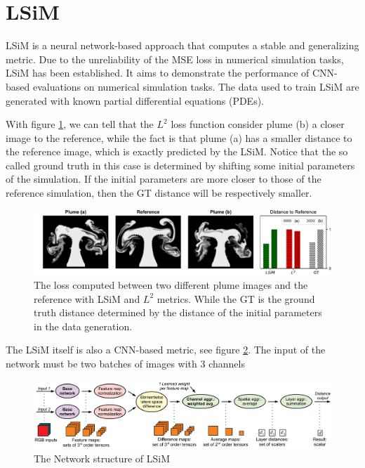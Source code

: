 \documentclass[a4paper,12pt,twoside]{report}
\begin{document}
\section{LSiM}

LSiM \cite{kohl2020learning} is a neural network-based approach that computes a stable and generalizing metric. Due to the unreliability of the MSE loss in numerical simulation tasks, LSiM has been established. It aims to demonstrate the performance of CNN-based evaluations on numerical simulation tasks. The data used to train LSiM are generated with known partial differential equations (PDEs). 

With figure \ref{lsimcompare}, we can tell that the $L^2$ loss function consider plume (b) a closer image to the reference, while the fact is that plume (a) has a smaller distance to the reference image, which is exactly predicted by the LSiM. Notice that the so called ground truth in this case is determined by shifting some initial parameters of the simulation. If the initial parameters are more closer to those of the reference simulation, then the GT distance will be respectively smaller.

\begin{figure}
\centering
\includegraphics[width=1.0\textwidth]{Plumes.pdf}
\caption{The loss computed between two different plume images and the reference with LSiM and $L^2$ metrics. While the GT is the ground truth distance determined by the distance of the initial parameters in the data generation. }
\label{lsimcompare}
\end{figure}
The LSiM itself is also a CNN-based metric, see figure \ref{lsim}. The input of the network must be two batches of images with 3 channels
\begin{figure}
\centering
\includegraphics[width=1.0\textwidth]{DistanceComputation.pdf}
\caption{The Network structure of LSiM}
\label{lsim}
\end{figure}
\end{document}
